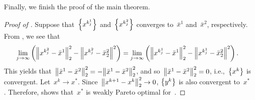 \documentclass[../main]{subfiles}
\begin{document}
Finally, we finish the proof of the main theorem.
\begin{proof}[Proof of ]
    Suppose that~$\set*{x^{k^1_j}}$ and~$\set*{x^{k^2_j}}$ converges to~$\bar{x}^1$ and~$\bar{x}^2$, respectively.
    From , we see that
    \begin{equation}
        \lim_{j \to \infty} \left( \norm*{x^{k^2_j} - \bar{x}^1}_2^2 - \norm*{x^{k^2_j} - \bar{x}_2^2}^2 \right) = \lim_{j \to \infty} \left( \norm*{x^{k^1_j} - \bar{x}^1}_2^2 - \norm*{x^{k^1_j} - \bar{x}_2^2}^2 \right) 
    .\end{equation} 
    This yields that~$\norm*{\bar{x}^1 - \bar{x}^2}_2^2 = - \norm*{\bar{x}^1 - \bar{x}^2}_2^2$, and so~$\norm*{\bar{x}^1 - \bar{x}^2}_2^2 = 0$, i.e.,~$\set*{x^k}$ is convergent.
    Let~$x^k \to x^\ast$.
    Since~$\norm*{x^{k + 1} - x^k}_2^2 \to 0$, $\set*{y^k}$ is also convergent to~$x^\ast$.
    Therefore,  shows that~$x^\ast$ is weakly Pareto optimal for~.
\end{proof}
\end{document}
